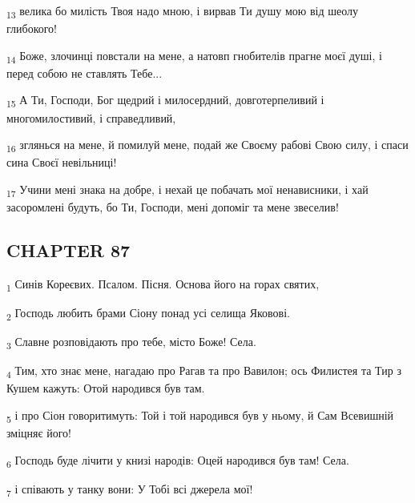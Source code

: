 \begin{tcolorbox}
\textsubscript{13} велика бо милість Твоя надо мною, і вирвав Ти душу мою від шеолу глибокого!
\end{tcolorbox}
\begin{tcolorbox}
\textsubscript{14} Боже, злочинці повстали на мене, а натовп гнобителів прагне моєї душі, і перед собою не ставлять Тебе...
\end{tcolorbox}
\begin{tcolorbox}
\textsubscript{15} А Ти, Господи, Бог щедрий і милосердний, довготерпеливий і многомилостивий, і справедливий,
\end{tcolorbox}
\begin{tcolorbox}
\textsubscript{16} зглянься на мене, й помилуй мене, подай же Своєму рабові Свою силу, і спаси сина Своєї невільниці!
\end{tcolorbox}
\begin{tcolorbox}
\textsubscript{17} Учини мені знака на добре, і нехай це побачать мої ненависники, і хай засоромлені будуть, бо Ти, Господи, мені допоміг та мене звеселив!
\end{tcolorbox}
\subsection{CHAPTER 87}
\begin{tcolorbox}
\textsubscript{1} Синів Кореєвих. Псалом. Пісня. Основа його на горах святих,
\end{tcolorbox}
\begin{tcolorbox}
\textsubscript{2} Господь любить брами Сіону понад усі селища Яковові.
\end{tcolorbox}
\begin{tcolorbox}
\textsubscript{3} Славне розповідають про тебе, місто Боже! Села.
\end{tcolorbox}
\begin{tcolorbox}
\textsubscript{4} Тим, хто знає мене, нагадаю про Рагав та про Вавилон; ось Филистея та Тир з Кушем кажуть: Отой народився був там.
\end{tcolorbox}
\begin{tcolorbox}
\textsubscript{5} і про Сіон говоритимуть: Той і той народився був у ньому, й Сам Всевишній зміцняє його!
\end{tcolorbox}
\begin{tcolorbox}
\textsubscript{6} Господь буде лічити у книзі народів: Оцей народився був там! Села.
\end{tcolorbox}
\begin{tcolorbox}
\textsubscript{7} і співають у танку вони: У Тобі всі джерела мої!
\end{tcolorbox}
